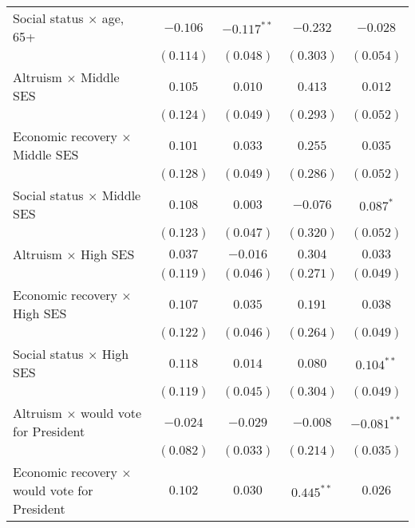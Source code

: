\begin{table}
\begin{center}
\begin{tabular}{l c c c c}
Social status $\times$ age, 65+                     & $-0.106$      & $-0.117^{**}$ & $-0.232$      & $-0.028$       \\
                                                    & $(0.114)$     & $(0.048)$     & $(0.303)$     & $(0.054)$      \\
Altruism $\times$ Middle SES                        & $0.105$       & $0.010$       & $0.413$       & $0.012$        \\
                                                    & $(0.124)$     & $(0.049)$     & $(0.293)$     & $(0.052)$      \\
Economic recovery $\times$ Middle SES               & $0.101$       & $0.033$       & $0.255$       & $0.035$        \\
                                                    & $(0.128)$     & $(0.049)$     & $(0.286)$     & $(0.052)$      \\
Social status $\times$ Middle SES                   & $0.108$       & $0.003$       & $-0.076$      & $0.087^{*}$    \\
                                                    & $(0.123)$     & $(0.047)$     & $(0.320)$     & $(0.052)$      \\
Altruism $\times$ High SES                          & $0.037$       & $-0.016$      & $0.304$       & $0.033$        \\
                                                    & $(0.119)$     & $(0.046)$     & $(0.271)$     & $(0.049)$      \\
Economic recovery $\times$ High SES                 & $0.107$       & $0.035$       & $0.191$       & $0.038$        \\
                                                    & $(0.122)$     & $(0.046)$     & $(0.264)$     & $(0.049)$      \\
Social status $\times$ High SES                     & $0.118$       & $0.014$       & $0.080$       & $0.104^{**}$   \\
                                                    & $(0.119)$     & $(0.045)$     & $(0.304)$     & $(0.049)$      \\
Altruism $\times$ would vote for President          & $-0.024$      & $-0.029$      & $-0.008$      & $-0.081^{**}$  \\
                                                    & $(0.082)$     & $(0.033)$     & $(0.214)$     & $(0.035)$      \\
Economic recovery $\times$ would vote for President & $0.102$       & $0.030$       & $0.445^{**}$  & $0.026$        \\

\end{tabular}
\end{center}
\end{table}
